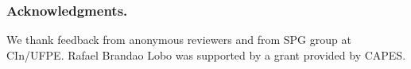 \subsubsection*{Acknowledgments.} We thank feedback from anonymous reviewers and from SPG group at CIn/UFPE. Rafael Brandao Lobo was supported by a grant provided by CAPES.